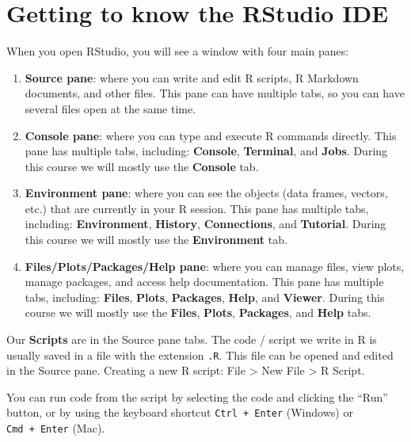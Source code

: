 \documentclass[
  letterpaper,
  8pt,
  a4paper]{book}
\providecommand{\tightlist}{%
  \setlength{\itemsep}{0pt}\setlength{\parskip}{0pt}}
\begin{document}
\section*{Getting to know the RStudio
IDE}\label{getting-to-know-the-rstudio-ide}


When you open RStudio, you will see a window with four main panes:

\begin{enumerate}
\def\labelenumi{\arabic{enumi}.}
\tightlist
\item
  \textbf{Source pane}: where you can write and edit R scripts, R
  Markdown documents, and other files. This pane can have multiple tabs,
  so you can have several files open at the same time.
\item
  \textbf{Console pane}: where you can type and execute R commands
  directly. This pane has multiple tabs, including: \textbf{Console},
  \textbf{Terminal}, and \textbf{Jobs}. During this course we will
  mostly use the \textbf{Console} tab.
\item
  \textbf{Environment pane}: where you can see the objects (data frames,
  vectors, etc.) that are currently in your R session. This pane has
  multiple tabs, including: \textbf{Environment}, \textbf{History},
  \textbf{Connections}, and \textbf{Tutorial}. During this course we
  will mostly use the \textbf{Environment} tab.
\item
  \textbf{Files/Plots/Packages/Help pane}: where you can manage files,
  view plots, manage packages, and access help documentation. This pane
  has multiple tabs, including: \textbf{Files}, \textbf{Plots},
  \textbf{Packages}, \textbf{Help}, and \textbf{Viewer}. During this
  course we will mostly use the \textbf{Files}, \textbf{Plots},
  \textbf{Packages}, and \textbf{Help} tabs.
\end{enumerate}

Our \textbf{Scripts} are in the Source pane tabs. The code / script we
write in R is usually saved in a file with the extension \texttt{.R}.
This file can be opened and edited in the Source pane. Creating a new R
script: File \textgreater{} New File \textgreater{} R Script.

You can run code from the script by selecting the code and clicking the
``Run'' button, or by using the keyboard shortcut
\texttt{Ctrl\ +\ Enter} (Windows) or \texttt{Cmd\ +\ Enter} (Mac).
\end{document}

